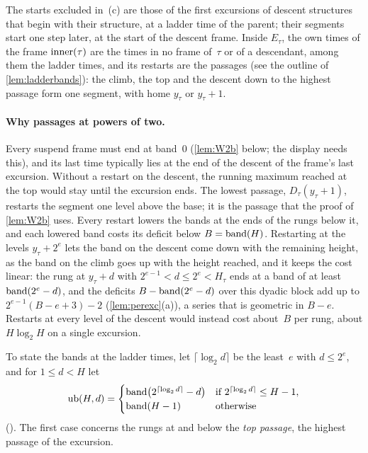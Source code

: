 The starts excluded in~(c) are those of the first excursions of descent structures that begin with their structure, at a
ladder time of the parent; their segments start one step later, at the start of the descent frame. Inside $E_\tau$, the own
times of the frame $\operatorname{inner}(\tau)$ are the times in no frame of~$\tau$ or of a descendant, among them the ladder times, and its
restarts are the passages (see the outline of \cref{lem:ladderbands}): the climb, the top and the descent down to the highest
passage form one segment, with home $y_\tau$ or $y_\tau+1$.

\paragraph{Why passages at powers of two.} Every suspend frame must end at band~$0$ (\cref{lem:W2b} below; the display needs
this), and its last time typically lies at the end of the descent of the frame's last excursion. Without a restart on the descent, the
running maximum reached at the top would stay until the excursion ends. The lowest passage, $D_\tau(y_\tau+1)$, restarts the
segment one level above the base; it is the passage that the proof of \cref{lem:W2b} uses. Every restart lowers the bands at the
ends of the rungs below it, and each lowered band costs its deficit below $B=\operatorname{band}(H)$. Restarting at the levels $y_\tau+2^e$
lets the band on the descent come down with the remaining height, as the band on the climb goes up with the height reached, and
it keeps the cost linear: the rung at $y_\tau+d$ with $2^{e-1}<d\le2^e<H_\tau$ ends at a band of at least $\operatorname{band}(2^e-d)$, and
the deficits $B-\operatorname{band}(2^e-d)$ over this dyadic block add up to $2^{e-1}(B-e+3)-2$ (\cref{lem:perexc}(a)), a series that is
geometric in $B-e$.
Restarts at every level of the descent would instead cost about~$B$ per rung, about $H\log_2H$ on a single excursion.

To state the bands at the ladder times, let $\lceil\log_2d\rceil$ be the least~$e$ with $d\le2^e$, and for $1\le d<H$ let
\[
  \mathrm{ub}(H,d)=\begin{cases}\operatorname{band}\bigl(2^{\lceil\log_2d\rceil}-d\bigr)&\text{if }2^{\lceil\log_2d\rceil}\le H-1,\\
  \operatorname{band}(H-1)&\text{otherwise}\end{cases}
\]
(). The first case concerns the rungs at and below the \emph{top passage}, the highest passage of the excursion.

